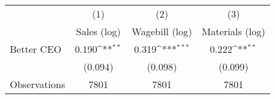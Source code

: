 {
\def\sym#1{\ifmmode^{#1}\else\(^{#1}\)\fi}
\begin{tabular}{l*{3}{c}}
\hline\hline
                    &\multicolumn{1}{c}{(1)}&\multicolumn{1}{c}{(2)}&\multicolumn{1}{c}{(3)}\\
                    &\multicolumn{1}{c}{Sales (log)}&\multicolumn{1}{c}{Wagebill (log)}&\multicolumn{1}{c}{Materials (log)}\\
\hline
Better CEO          &       0.190\sym{**} &       0.319\sym{***}&       0.222\sym{**} \\
                    &     (0.094)         &     (0.098)         &     (0.099)         \\
\hline
Observations        &        7801         &        7801         &        7801         \\
\hline\hline
\end{tabular}
}
